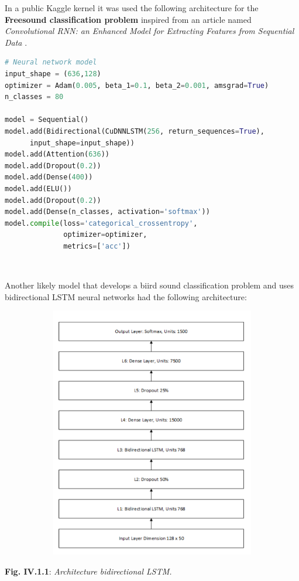 \documentclass[11pt, a4papper]{report}
\theoremstyle{plain}
\theoremstyle{definition}
\theoremstyle{definition}
\theoremstyle{proposition}
\begin{document}
In a public Kaggle kernel  \cite{8} it was used the following architecture for the \textbf{Freesound classification problem} inspired from an article named \textit{Convolutional RNN: an Enhanced Model for
Extracting Features from Sequential Data} \cite{11}.

\begin{lstlisting}[language=Python]
# Neural network model
input_shape = (636,128)
optimizer = Adam(0.005, beta_1=0.1, beta_2=0.001, amsgrad=True)
n_classes = 80

model = Sequential()
model.add(Bidirectional(CuDNNLSTM(256, return_sequences=True),
	  input_shape=input_shape))
model.add(Attention(636))
model.add(Dropout(0.2))
model.add(Dense(400))
model.add(ELU())
model.add(Dropout(0.2)) 
model.add(Dense(n_classes, activation='softmax'))
model.compile(loss='categorical_crossentropy',
              optimizer=optimizer,
              metrics=['acc'])
\end{lstlisting}
\

Another likely model that develops a biird sound classification problem and uses bidirectional
LSTM neural networks had the following architecture:
\begin{center}
\includegraphics[width=16cm,height=11cm,keepaspectratio]{architecture-bidirect-LSTM.png}
\end{center}
\begin{center}
\textbf{Fig. IV.1.1}: \textit{Architecture bidirectional LSTM. \cite{10}}
\end{center}
\end{document}
